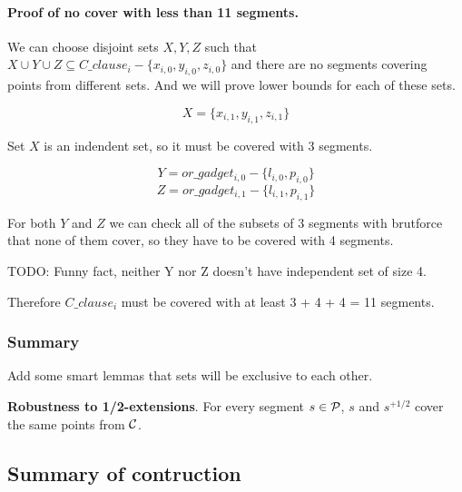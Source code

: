 \paragraph{Proof of no cover with less than 11 segments.}

We can choose disjoint sets $X, Y, Z$ such that
$X \cup Y \cup Z \subseteq C\_clause_i - \{x_{i, 0}, y_{i, 0}, z_{i, 0}\}$
and there are no segments covering points from different sets.
And we will prove lower bounds for each of these sets.

$$X = \{x_{i, 1}, y_{i, 1}, z_{i, 1}\}$$

Set $X$ is an indendent set, so it must be covered with 3 segments.

$$Y = or\_gadget_{i, 0} - \{l_{i, 0}, p_{i, 0}\}$$
$$Z = or\_gadget_{i, 1} - \{l_{i, 1}, p_{i, 1}\}$$


For both $Y$ and $Z$ we can check all of the subsets of 3 segments
with brutforce that none of them cover, so they have to be covered with
4 segments.

TODO: Funny fact, neither Y nor Z doesn't have independent set of size 4.

Therefore $C\_clause_i$ must be covered with at least 3 + 4 + 4 = 11 segments.

\subsubsection{Summary}

Add some smart lemmas that sets will be exclusive to each other.

\begin{lemma}
\textbf{Robustness to 1/2-extensions}. For every segment $s \in \mathcal{P}$,
$s$ and $s^{+1/2}$ cover the same points from $\mathcal{C}$.
\end{lemma}


\subsection{Summary of contruction}

